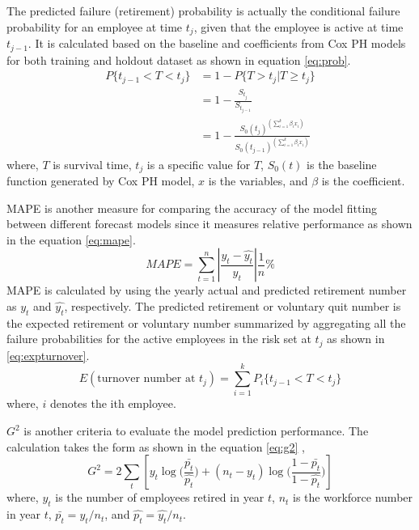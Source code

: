 \documentclass[12pt,letterpaper]{article}
\begin{document}
The predicted failure (retirement) probability is actually the conditional failure probability for an employee at time $t_j$, given that the employee is active at time $t_{j-1}$. It is calculated based on the baseline and coefficients from Cox PH models for both training and holdout dataset as shown in equation \ref{eq:prob}.
\begin{equation}
\label{eq:prob}
\begin{split}%
P\{t_{j-1}<T<t_j\} &=1-P\{T>t_j|T \ge t_j\}\\
&=1-\frac{S_{t_j}}{S_{t_{j-1}}}   \\
&=1-\frac{{S_0(t_j)}^{(\sum_{i=1}^{k}\beta_ix_i)}}{   {S_0(t_{j-1})}^{(\sum_{i=1}^{k}\beta_ix_i)}}
\end{split}
\end{equation}
where, $T$ is survival time, $t_j$ is a specific value for $T$, $S_0(t)$ is the baseline function generated by Cox PH model, $x$ is the variables, and $\beta$ is the coefficient.

MAPE is another measure for comparing the accuracy of the model fitting between different forecast models since it measures relative performance \citep{chu1998} as shown in the equation \ref{eq:mape}.
\begin{equation}
	\label{eq:mape}
	MAPE=\sum_{t=1}^{n}\left | \frac{y_t-\hat{y_t}}{y_t} \right |\frac{1}{n}\%
\end{equation}
MAPE is calculated by using the yearly actual and predicted retirement number as $y_t$ and $\hat{y_t}$, respectively.
The predicted retirement or voluntary quit number is the expected retirement or voluntary number summarized by aggregating all the failure probabilities for the active employees in the risk set at $t_j$ as shown in \ref{eq:expturnover}.
\begin{equation}
\label{eq:expturnover}
E(\text{turnover number at } t_j)=\sum_{i=1}^k{P_i\{t_{j-1}<T<t_j\}}
\end{equation}
where, $i$ denotes the ith employee.

$G^2$ is another criteria to evaluate the model prediction performance. The calculation takes the form as shown in the equation \ref{eq:g2} \citep{simonoff2013},
\begin{equation}
\label{eq:g2}
G^2=2\sum_{t}[y_t\log{(\frac{\bar{p_t}}{\hat{p_t}}})+ (n_t-y_t)\log{(\frac{1-\bar{p_t}}{1-\hat{p_t}}})]
\end{equation}
where, $y_t$ is the number of employees retired in year $t$, $n_t$ is the workforce number in year $t$, $\bar{p_t}={y_t}/{n_t}$, and $\hat{p_t}={\hat{y_t}}/{n_t} $.
\end{document}
